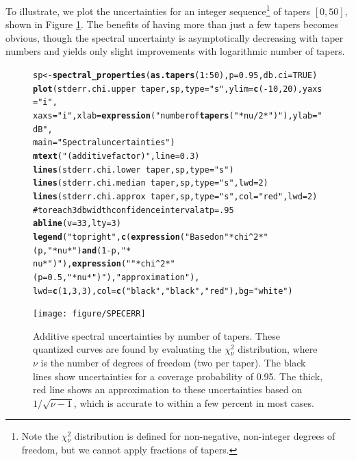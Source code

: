 \documentclass{article}\usepackage{graphicx, color}
\makeatletter
\newcommand{\hlfunctioncall}[1]{\textcolor[rgb]{0.501960784313725,0,0.329411764705882}{\textbf{#1}}}%
\newcommand{\hlstring}[1]{\textcolor[rgb]{0.6,0.6,1}{#1}}%
\newcommand{\hlcomment}[1]{\textcolor[rgb]{0.180392156862745,0.6,0.341176470588235}{#1}}%
\newenvironment{kframe}{%
 \def\at@end@of@kframe{}%
 \ifinner\ifhmode%
  \def\at@end@of@kframe{\end{minipage}}%
  \begin{minipage}{\columnwidth}%
 \fi\fi%
 \def\FrameCommand##1{\hskip\@totalleftmargin \hskip-\fboxsep
 \colorbox{shadecolor}{##1}\hskip-\fboxsep
     \hskip-\linewidth \hskip-\@totalleftmargin \hskip\columnwidth}%
 \MakeFramed {\advance\hsize-\width
   \@totalleftmargin\z@ \linewidth\hsize
   \@setminipage}}%
 {\par\unskip\endMakeFramed%
 \at@end@of@kframe}
\newenvironment{knitrout}{}{} %
\makeatother
\begin{document}
To illustrate, we 
plot the uncertainties for an integer sequence\footnote{
Note the $\chi{}_{\nu}^2$ distribution is defined for non-negative,
non-integer degrees of freedom, but we cannot apply
fractions of tapers.} of tapers $[0, 50]$, shown in
Figure \ref{fig:psderr}.  The benefits of having more than just
a few tapers becomes obvious, though the spectral uncertainty
is asymptotically decreasing with taper numbers and yields
only slight improvements with logarithmic number of tapers.

\begin{figure}[htb!]
\begin{center}
\begin{knitrout}
\color{fgcolor}\begin{kframe}
\begin{alltt}
sp <- \hlfunctioncall{spectral_properties}(\hlfunctioncall{as.tapers}(1:50), p = 0.95, db.ci = TRUE)
\hlfunctioncall{plot}(stderr.chi.upper ~ taper, sp, type = \hlstring{"s"}, ylim = \hlfunctioncall{c}(-10, 20), yaxs = \hlstring{"i"}, 
    xaxs = \hlstring{"i"}, xlab = \hlfunctioncall{expression}(\hlstring{"number of \hlfunctioncall{tapers} ("} * nu/2 * \hlstring{")"}), ylab = \hlstring{"dB"}, 
    main = \hlstring{"Spectral uncertainties"})
\hlfunctioncall{mtext}(\hlstring{"(additive factor)"}, line = 0.3)
\hlfunctioncall{lines}(stderr.chi.lower ~ taper, sp, type = \hlstring{"s"})
\hlfunctioncall{lines}(stderr.chi.median ~ taper, sp, type = \hlstring{"s"}, lwd = 2)
\hlfunctioncall{lines}(stderr.chi.approx ~ taper, sp, type = \hlstring{"s"}, col = \hlstring{"red"}, lwd = 2)
\hlcomment{# to reach 3 db width confidence interval at p=.95}
\hlfunctioncall{abline}(v = 33, lty = 3)
\hlfunctioncall{legend}(\hlstring{"topright"}, \hlfunctioncall{c}(\hlfunctioncall{expression}(\hlstring{"Based on "} * chi^2 * \hlstring{"(p,"} * nu * \hlstring{") \hlfunctioncall{and} (1-p,"} * 
    nu * \hlstring{")"}), \hlfunctioncall{expression}(\hlstring{""} * chi^2 * \hlstring{"(p=0.5,"} * nu * \hlstring{")"}), \hlstring{"approximation"}), 
    lwd = \hlfunctioncall{c}(1, 3, 3), col = \hlfunctioncall{c}(\hlstring{"black"}, \hlstring{"black"}, \hlstring{"red"}), bg = \hlstring{"white"})
\end{alltt}
\end{kframe}
\texttt{[image: figure/SPECERR]} 

\end{knitrout}

\caption{Additive spectral uncertainties by number of tapers.
These quantized curves are found
by evaluating the $\chi{}_{\nu}^2$ distribution, where $\nu$ is
the number of degrees of freedom (two per taper).  
The black lines show uncertainties for a coverage probability of 0.95.
The thick, red line shows an approximation to these uncertainties
based on $1/\sqrt{\nu-1}$, which is accurate to within a few percent in most cases.
}
\label{fig:psderr}
\end{center}
\end{figure}
\end{document}
